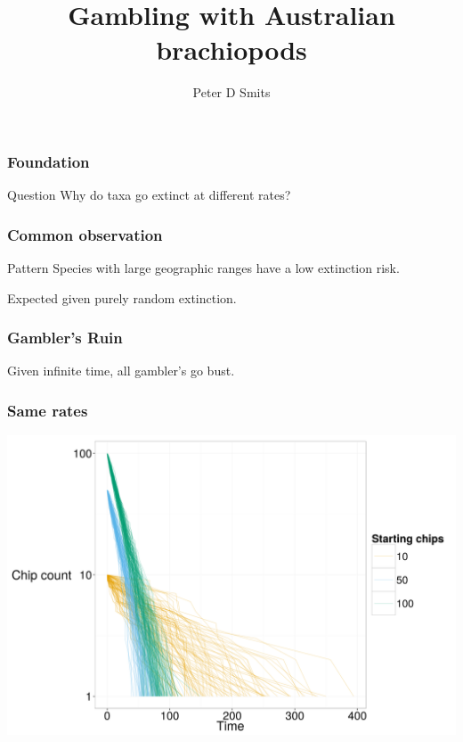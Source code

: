 \documentclass{beamer}
\title{Gambling with Australian brachiopods}
\author{Peter D Smits}
\institute{Committee on Evolutionary Biology, University of Chicago}
\begin{document}
\begin{frame}
  \maketitle
\end{frame}

\begin{frame}
  \frametitle{Foundation}

  \begin{alertblock}{Question}
    Why do taxa go extinct at different rates?
  \end{alertblock}
\end{frame}


\begin{frame}
  \frametitle{Common observation}

  \begin{block}{Pattern}
    Species with large geographic ranges have a low extinction risk.
  \end{block}

  \bigskip

  \begin{center}
    Expected given \alert{purely random} extinction.
  \end{center}
\end{frame}


\begin{frame}
  \frametitle{Gambler's Ruin}

  \begin{definition}
    Given infinite time, all gambler's go bust. 
  \end{definition}
\end{frame}


\begin{frame}
  \frametitle{Same rates}

  \includegraphics[width = \textwidth, height = 0.8\textheight, keepaspectratio = true]{figure/gambling}
\end{frame}
\end{document}
